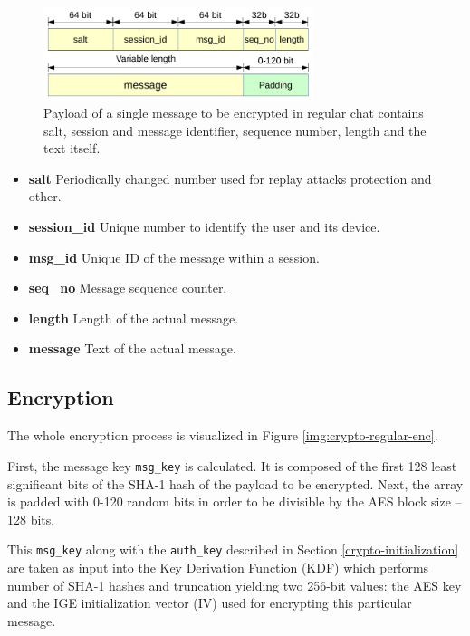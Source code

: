 \documentclass[thesis=M,english]{FITthesis}[2012/10/20]
\begin{document}
\begin{figure}[htb]
	\centering
	\includegraphics[width=0.7\textwidth]{regular-payload.pdf}
	\caption[Message payload in regular chats]{Payload of a single message to be encrypted in regular chat contains salt, session and message identifier, sequence number, length and the text itself.}
	\label{img:regular-payload}
\end{figure}

\begin{itemize}
	\item \textbf{salt} Periodically changed number used for replay attacks protection and other.
	\item \textbf{session\_id} Unique number to identify the user and its device.
	\item \textbf{msg\_id} Unique ID of the message within a session.
	\item \textbf{seq\_no} Message sequence counter.
	\item \textbf{length} Length of the actual message.
	\item \textbf{message} Text of the actual message.
\end{itemize}


\subsection{Encryption}\label{crypto-regular-enc}

The whole encryption process is visualized in Figure \ref{img:crypto-regular-enc}.

First, the message key \texttt{msg\_key} is calculated. It is composed of the first 128 least significant bits of the SHA-1 hash of the payload to be encrypted. Next, the array is padded with 0-120 random bits in order to be divisible by the AES block size -- 128 bits.

This \texttt{msg\_key} along with the \texttt{auth\_key} described in Section \ref{crypto-initialization} are taken as input into the Key Derivation Function (KDF) which performs number of SHA-1 hashes and truncation yielding two 256-bit values: the AES key and the IGE initialization vector (IV) used for encrypting this particular message.
\end{document}
